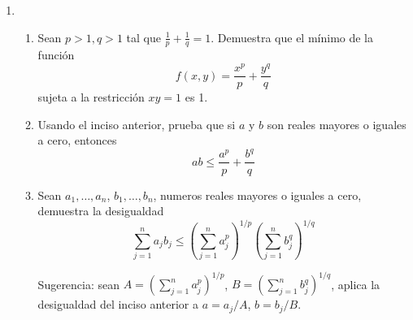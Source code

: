 \documentclass{article}
\theoremstyle{definition}
\begin{document}
\begin{enumerate}
        \item
          \begin{enumerate}
          \item Sean $p>1, q>1$ tal que $\frac{1}{p}+\frac{1}{q}=1$. Demuestra
            que el m\'inimo de la funci\'on
            $$
            f(x,y)=\frac{x^p}{p}+\frac{y^q}{q}
            $$
            sujeta a la restricci\'on $xy=1$ es 1.

          \item Usando el inciso anterior, prueba que si $a$ y $b$ son
            reales mayores o iguales a cero, entonces
            $$
            ab \leq \frac{a^p}{p}+\frac{b^q}{q}
            $$
          \item Sean $a_1,\dots, a_n$, $b_1,\dots, b_n$, numeros
            reales mayores o iguales a cero, demuestra la desigualdad
            $$
            \sum_{j=1}^n a_jb_j \leq \left( \sum_{j=1}^n a_j^p \right)^{1/p}
            \left( \sum_{j=1}^n b_j^q \right)^{1/q}
            $$

            Sugerencia: sean $A=\left( \sum_{j=1}^n a_j^p \right)^{1/p}$,
            $B=\left( \sum_{j=1}^n b_j^q \right)^{1/q}$, aplica
            la desigualdad del inciso anterior a $a=a_j/A$, $b=b_j/B$.
         
          \end{enumerate}
          
            
          \end{enumerate}
          

          

	
  
       
\end{document}
